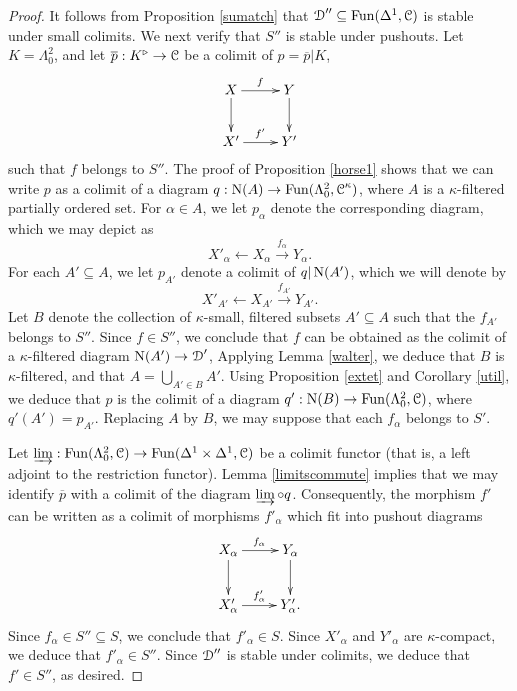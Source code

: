 \begin{proof}
It follows from Proposition \ref{sumatch} that $\operatorname{\mathcal{D}}'' \subseteq \operatorname{Fun}(\Delta^1,\operatorname{\mathcal{C}})$ is stable under small colimits. We next verify that $S''$ is stable under pushouts. Let $K = \Lambda^2_0$, and let
$\overline{p}: K^{\triangleright} \rightarrow \operatorname{\mathcal{C}}$ be a colimit of $p=\overline{p} | K$, 
$$ \xymatrix{ X \ar[r]^{f} \ar[d] & Y \ar[d] \\
X' \ar[r]^{f'} & Y' }$$
such that $f$ belongs to $S''$. The proof of Proposition \ref{horse1} shows that we can write
$p$ as a colimit of a diagram $q: \operatorname{N}(A) \rightarrow \operatorname{Fun}(\Lambda^2_0,\operatorname{\mathcal{C}}^{\kappa})$,
where $A$ is a $\kappa$-filtered partially ordered set. For $\alpha \in A$, we let
$p_{\alpha}$ denote the corresponding diagram, which we may depict as
$$ X'_{\alpha} \leftarrow X_{\alpha} \stackrel{ f_{\alpha} }{\rightarrow} Y_{\alpha}.$$
For each $A' \subseteq A$, we let $p_{A'}$ denote a colimit of $q| \operatorname{N}(A')$, which we will denote by
$$ X'_{A'} \leftarrow X_{A'} \stackrel{ f_{A'} }{\rightarrow} Y_{A'}. $$
Let $B$ denote the collection of $\kappa$-small, filtered subsets $A' \subseteq A$ such that
the $f_{A'}$ belongs to $S''$. Since $f \in S''$, we conclude that $f$ can be 
obtained as the colimit of a $\kappa$-filtered diagram $\operatorname{N}(A') \rightarrow \operatorname{\mathcal{D}}'$,
Applying Lemma \ref{walter}, we deduce that $B$ is $\kappa$-filtered, and that $A = \bigcup_{A' \in B} A'$. Using Proposition \ref{extet} and Corollary \ref{util}, we deduce that $p$ is the colimit of a
diagram $q': \operatorname{N}(B) \rightarrow \operatorname{Fun}(\Lambda^2_0,\operatorname{\mathcal{C}})$, where $q'(A') = p_{A'}$. Replacing
$A$ by $B$, we may suppose that each $f_{\alpha}$ belongs to $S'$.

Let $\operatorname{\varinjlim}: \operatorname{Fun}(\Lambda^2_0,\operatorname{\mathcal{C}}) \rightarrow \operatorname{Fun}(\Delta^1 \times \Delta^1,\operatorname{\mathcal{C}})$ be a colimit functor
(that is, a left adjoint to the restriction functor). Lemma \ref{limitscommute} implies
that we may identify $\overline{p}$ with a colimit of the diagram $\operatorname{\varinjlim} \circ q$. 
Consequently, the morphism $f'$ can be written as a colimit of morphisms $f'_{\alpha}$ which
fit into pushout diagrams
$$ \xymatrix{ X_{\alpha} \ar[r]^{f_{\alpha}} \ar[d] & Y_{\alpha} \ar[d] \\
X'_{\alpha} \ar[r]^{f'_{\alpha}} & Y'_{\alpha}. }$$
Since $f_{\alpha} \in S'' \subseteq S$, we conclude that $f'_{\alpha} \in S$. Since
$X'_{\alpha}$ and $Y'_{\alpha}$ are $\kappa$-compact, we deduce that
$f'_{\alpha} \in S''$. Since $\operatorname{\mathcal{D}}''$ is stable under colimits, we deduce that $f' \in S''$, as desired.


\end{proof}
